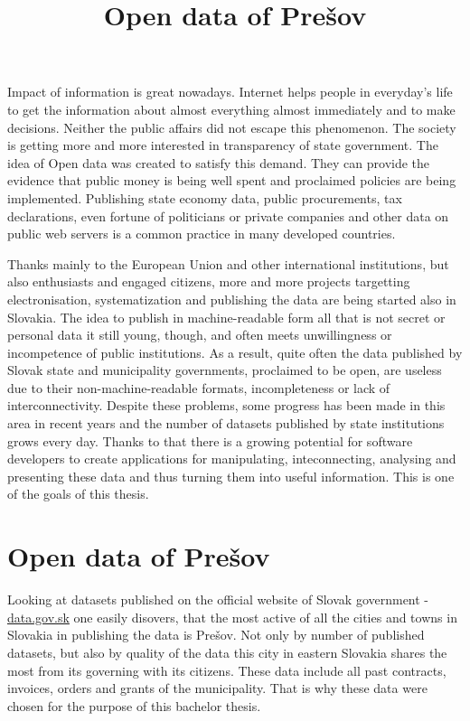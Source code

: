 \documentclass[thesis=B,english]{FITthesis}[2012/06/26]
\title{Open data of Prešov}
\begin{document}

\begin{introduction}
	Impact of information is great nowadays. Internet helps people in everyday's life to get the information about almost everything almost immediately and to make decisions.
	Neither the public affairs did not escape this phenomenon. The society is getting more and more interested in transparency of state government. The idea of Open data was created to satisfy this demand. They can provide the evidence that public money is being well spent and proclaimed policies are being implemented. Publishing state economy data, public procurements, tax declarations, even fortune of politicians or private companies and other data on public web servers is a common practice in many developed countries.
	\par Thanks mainly to the European Union and other international institutions, but also enthusiasts and engaged citizens, more and more projects targetting electronisation, systematization and publishing the data are being started also in Slovakia. The idea to publish in machine-readable form all that is not secret or personal data it still young, though, and often meets unwillingness or incompetence of public institutions. As a result, quite often the data published by Slovak state and municipality governments, proclaimed to be open, are useless due to their non-machine-readable formats, incompleteness or lack of interconnectivity.
		Despite these problems, some progress has been made in this area in recent years and the number of datasets published by state institutions grows every day. Thanks to that there is a growing potential for software developers to create applications for manipulating, inteconnecting, analysing and presenting these data and thus turning them into useful information. This is one of the goals of this thesis.
	\section*{Open data of Prešov}
	Looking at datasets published on the official website of Slovak government - \href{https://data.gov.sk}{data.gov.sk} one easily disovers, that the most active of all the cities and towns in Slovakia in publishing the data is Prešov. Not only by number of published datasets, but also by quality of the data this city in eastern Slovakia shares the most from its governing with its citizens. These data include all past contracts, invoices, orders and grants of the municipality. That is why these data were chosen for the purpose of this bachelor thesis.

\end{introduction}
\end{document}
